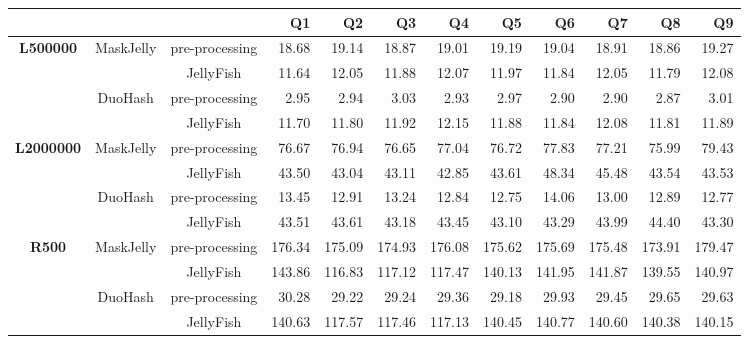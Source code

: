 \begin{sidewaystable}
	\centering
	\begin{tabular}{ccc | rrrrrrrrr}
		& & & \textbf{Q1} & \textbf{Q2} & \textbf{Q3} & \textbf{Q4} & \textbf{Q5} & \textbf{Q6} & \textbf{Q7} & \textbf{Q8} & \textbf{Q9} \\
		\toprule
		\multirow{4}{*}{\textbf{L500000}}
		& \multirow{2}{*}{MaskJelly} & pre-processing & 18.68 & 19.14 & 18.87 & 19.01 & 19.19 & 19.04 & 18.91 & 18.86 & 19.27 \\
		& & JellyFish & 11.64 & 12.05 & 11.88 & 12.07 & 11.97 & 11.84 & 12.05 & 11.79 & 12.08 \\
		\cmidrule{2-12}
		& \multirow{2}{*}{DuoHash} & pre-processing & 2.95 & 2.94 & 3.03 & 2.93 & 2.97 & 2.90 & 2.90 & 2.87 & 3.01 \\
		& & JellyFish & 11.70 & 11.80 & 11.92 & 12.15 & 11.88 & 11.84 & 12.08 & 11.81 & 11.89 \\
		
		\midrule[\heavyrulewidth]
		
		\multirow{4}{*}{\textbf{L2000000}}
		& \multirow{2}{*}{MaskJelly} & pre-processing & 76.67 & 76.94 & 76.65 & 77.04 & 76.72 & 77.83 & 77.21 & 75.99 & 79.43 \\
		& & JellyFish & 43.50 & 43.04 & 43.11 & 42.85 & 43.61 & 48.34 & 45.48 & 43.54 & 43.53 \\
		\cmidrule{2-12}
		& \multirow{2}{*}{DuoHash} & pre-processing & 13.45 & 12.91 & 13.24 & 12.84 & 12.75 & 14.06 & 13.00 & 12.89 & 12.77 \\
		& & JellyFish & 43.51 & 43.61 & 43.18 & 43.45 & 43.10 & 43.29 & 43.99 & 44.40 & 43.30 \\
		
		\midrule[\heavyrulewidth]
		
		\multirow{4}{*}{\textbf{R500}}
		& \multirow{2}{*}{MaskJelly} & pre-processing & 176.34 & 175.09 & 174.93 & 176.08 & 175.62 & 175.69 & 175.48 & 173.91 & 179.47 \\
		& & JellyFish & 143.86 & 116.83 & 117.12 & 117.47 & 140.13 & 141.95 & 141.87 & 139.55 & 140.97 \\
		\cmidrule{2-12}
		& \multirow{2}{*}{DuoHash} & pre-processing & 30.28 & 29.22 & 29.24 & 29.36 & 29.18 & 29.93 & 29.45 & 29.65 & 29.63 \\
		& & JellyFish & 140.63 & 117.57 & 117.46 & 117.13 & 140.45 & 140.77 & 140.60 & 140.38 & 140.15 \\
		
		\midrule[\heavyrulewidth]
		

\end{tabular}
\end{sidewaystable}
